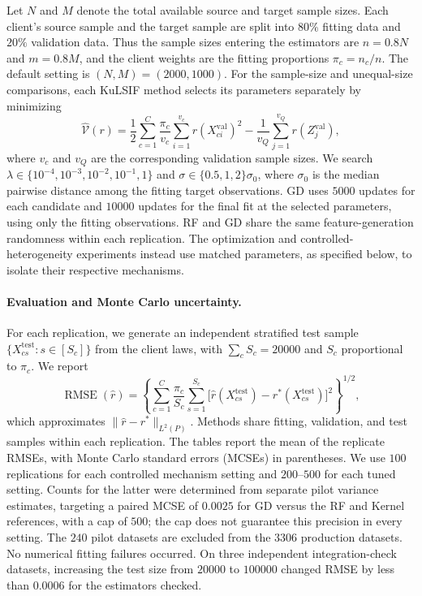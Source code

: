 Let $N$ and $M$ denote the total available source and target sample sizes.
Each client's source sample and the target sample are split into $80\%$
fitting data and $20\%$ validation data. Thus the sample sizes entering the
estimators are $n=0.8N$ and $m=0.8M$, and the client weights are the fitting
proportions $\pi_c=n_c/n$. The default setting is $(N,M)=(2000,1000)$.
For the sample-size and unequal-size comparisons, each KuLSIF method selects
its parameters separately by minimizing
\[
\widehat{\mathcal V}(r)
=\frac12\sum_{c=1}^C\frac{\pi_c}{v_c}
  \sum_{i=1}^{v_c}r(X_{ci}^{\mathrm{val}})^2
-\frac{1}{v_Q}\sum_{j=1}^{v_Q}r(Z_j^{\mathrm{val}}),
\]
where $v_c$ and $v_Q$ are the corresponding validation sample sizes.
We search $\lambda\in\{10^{-4},10^{-3},10^{-2},10^{-1},1\}$ and
$\sigma\in\{0.5,1,2\}\sigma_0$, where $\sigma_0$ is the median pairwise
distance among the fitting target observations. GD uses $5000$ updates for
each candidate and $10000$ updates for the final fit at the selected
parameters, using only the fitting observations. RF and GD share the same
feature-generation randomness within each replication. The optimization and
controlled-heterogeneity experiments instead use matched parameters, as
specified below, to isolate their respective mechanisms.

\paragraph{Evaluation and Monte Carlo uncertainty.}
For each replication, we generate an independent stratified test sample
$\{X_{cs}^{\mathrm{test}}:s\in[S_c]\}$ from the client laws, with
$\sum_cS_c=20000$ and $S_c$ proportional to $\pi_c$. We report
\[
\operatorname{RMSE}(\widehat r)
=\left\{\sum_{c=1}^C\frac{\pi_c}{S_c}
\sum_{s=1}^{S_c}
\bigl[\widehat r(X_{cs}^{\mathrm{test}})
      -r^*(X_{cs}^{\mathrm{test}})\bigr]^2\right\}^{1/2},
\]
which approximates $\|\widehat r-r^*\|_{L^2(P)}$.
Methods share fitting, validation, and test samples within each replication.
The tables report the mean of the replicate RMSEs, with Monte Carlo standard
errors (MCSEs) in parentheses. We use $100$ replications for each controlled
mechanism setting and $200$--$500$ for each tuned setting. Counts for the
latter were determined from separate pilot variance estimates, targeting a
paired MCSE of $0.0025$ for GD versus the RF and Kernel references, with a
cap of $500$; the cap does not guarantee this precision in every setting.
The $240$ pilot datasets are excluded from the $3306$ production datasets.
No numerical fitting failures occurred. On three independent integration-check
datasets, increasing the test size from $20000$ to $100000$ changed RMSE
by less than $0.0006$ for the estimators checked.

